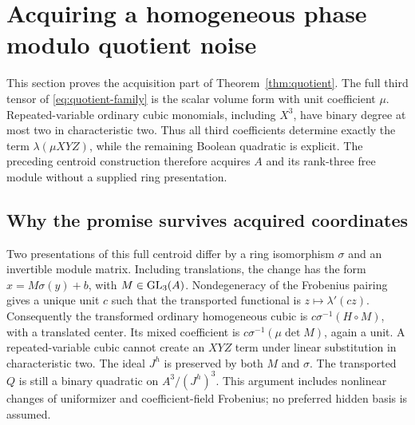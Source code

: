 \section{Acquiring a homogeneous phase modulo quotient noise}\label{sec:quotientfit}
This section proves the acquisition part of Theorem~\ref{thm:quotient}.
The full third tensor of \eqref{eq:quotient-family} is the scalar volume
form with unit coefficient $\mu$. Repeated-variable ordinary cubic
monomials, including $X^3$, have binary degree at most two in
characteristic two. Thus all third coefficients determine exactly the
term $\lambda(\mu XYZ)$, while the remaining Boolean quadratic is explicit.
The preceding centroid construction therefore acquires $A$ and its
rank-three free module without a supplied ring presentation.

\subsection{Why the promise survives acquired coordinates}
Two presentations of this full centroid differ by a ring isomorphism
$\sigma$ and an invertible module matrix. Including translations, the
change has the form $x=M\sigma(y)+b$, with $M\in\operatorname{GL}_3(A)$.
Nondegeneracy of the Frobenius pairing gives a unique unit $c$ such that
the transported functional is $z\mapsto\lambda'(cz)$. Consequently
the transformed ordinary homogeneous cubic is
$c\sigma^{-1}(H\circ M)$, with a translated center.
Its mixed coefficient is
$c\sigma^{-1}(\mu\det M)$, again a unit. A repeated-variable cubic
cannot create an $XYZ$ term under linear substitution in characteristic two.
The ideal $J^h$ is preserved by both $M$ and $\sigma$.
The transported $Q$ is still a binary quadratic on $A^3/(J^h)^3$.
This argument includes nonlinear changes of uniformizer and coefficient-field
Frobenius; no preferred hidden basis is assumed.

